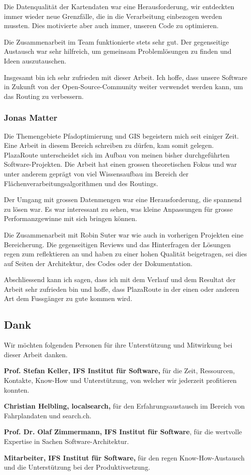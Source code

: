 Die Datenqualität der Kartendaten war eine Herausforderung, wir entdeckten immer wieder neue Grenzfälle, die in die Verarbeitung einbezogen werden mussten. Dies motivierte aber auch immer, unseren Code zu optimieren.

Die Zusammenarbeit im Team funktionierte stets sehr gut. Der gegenseitige Austausch war sehr hilfreich, um gemeinsam Problemlösungen zu finden und Ideen auszutauschen.

Insgesamt bin ich sehr zufrieden mit dieser Arbeit. Ich hoffe, dass unsere Software in Zukunft von der Open-Source-Community weiter verwendet werden kann, um das Routing zu verbessern.


\subsubsection{Jonas Matter}
\label{Persönliche Berichte:Jonas Matter}
Die Themengebiete Pfadoptimierung und \ac{GIS} begeistern mich seit einiger Zeit. Eine Arbeit in diesem Bereich schreiben zu dürfen, kam somit gelegen. PlazaRoute unterscheidet sich im Aufbau von meinen bisher durchgeführten Software-Projekten. Die Arbeit hat einen grossen theoretischen Fokus und war unter anderem geprägt von viel Wissensaufbau im Bereich der Flächenverarbeitungsalgorithmen und des Routings. 

Der Umgang mit grossen Datenmengen war eine Herausforderung, die spannend zu lösen war. Es war interessant zu sehen, was kleine Anpassungen für grosse Performanzgewinne mit sich bringen können.

Die Zusammenarbeit mit Robin Suter war wie auch in vorherigen Projekten eine Bereicherung. Die gegenseitigen Reviews und das Hinterfragen der Lösungen regen zum reflektieren an und haben zu einer hohen Qualität beigetragen, sei dies auf Seiten der Architektur, des Codes oder der Dokumentation.

Abschliessend kann ich sagen, dass ich mit dem Verlauf und dem Resultat der Arbeit sehr zufrieden bin und hoffe, dass PlazaRoute in der einen oder anderen Art dem Fussgänger zu gute kommen wird.


\subsection{Dank}
\label{sub:Dank}

Wir möchten folgenden Personen für ihre Unterstützung und Mitwirkung bei dieser Arbeit danken.

\textbf{Prof. Stefan Keller, IFS Institut für Software,} für die Zeit, Ressourcen, Kontakte, Know-How und Unterstützung, von welcher wir jederzeit profitieren konnten.

\textbf{Christian Helbling, localsearch,} für den Erfahrungsaustausch im Bereich von Fahrplandaten und search.ch.

\textbf{Prof. Dr. Olaf Zimmermann, IFS Institut für Software}, für die wertvolle Expertise in Sachen Software-Architektur.

\textbf{Mitarbeiter, IFS Institut für Software,} für den regen Know-How-Austausch und die Unterstützung bei der Produktivsetzung.
